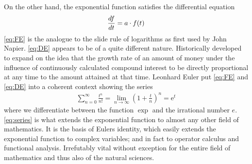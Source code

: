 \documentclass[a4paper, twocolumn, 11pt, oneside]{memoir}
\begin{document}
On the other hand, the exponential function satisfies the differential equation
\begin{equation}
  \diff[d]{f}{t} = a\cdot f(t) %
\label{eq:DE}
\end{equation}
\cref{eq:FE} is the analogue to the slide rule of logarithms as first used by John
Napier\cite{john_napier_wiki}.
\cref{eq:DE} appears to be of a quite different
nature. Historically developed to expand on the idea that the growth rate of an
amount of money under the influence of continuously calculated compound
interest to be directly proportional at any time to the amount attained at that
time. Leonhard Euler put \cref{eq:FE} and \cref{eq:DE} into a coherent context
showing the series
\begin{align}
  \sum_{n=0}^{\infty} \frac{t^n}{n!} = \lim_{n\rightarrow \infty} \left(1 + \frac{t}{n}\right)^n = \text{e}^t%
\label{eq:series}
\end{align}
where we differentiate between the function $\exp$ and the irrational number
$e$.
\cref{eq:series} is what extends the exponential function to almost any other
field of mathematics. It is the basis of Eulers identity, which easily extends
the exponential function to complex variables; and in fact to operator calculus
and functional analysis.
Irrefutably vital without exception for the entire field of mathematics and
thus also of the natural sciences.
\end{document}
